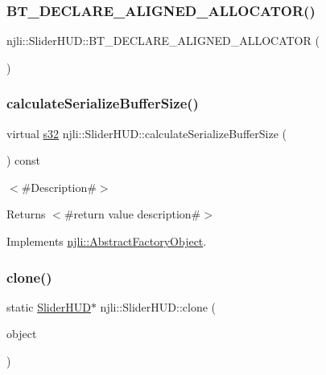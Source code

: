 \subsubsection{\texorpdfstring{B\+T\+\_\+\+D\+E\+C\+L\+A\+R\+E\+\_\+\+A\+L\+I\+G\+N\+E\+D\+\_\+\+A\+L\+L\+O\+C\+A\+T\+O\+R()}{BT\_DECLARE\_ALIGNED\_ALLOCATOR()}}
{\footnotesize\ttfamily njli\+::\+Slider\+H\+U\+D\+::\+B\+T\+\_\+\+D\+E\+C\+L\+A\+R\+E\+\_\+\+A\+L\+I\+G\+N\+E\+D\+\_\+\+A\+L\+L\+O\+C\+A\+T\+OR (\begin{DoxyParamCaption}{ }\end{DoxyParamCaption})\hspace{0.3cm}{\ttfamily [protected]}}

\mbox{\label{classnjli_1_1_slider_h_u_d_ac8b3369b0456c8fa0d8765975edc3ed0}} 
\subsubsection{\texorpdfstring{calculate\+Serialize\+Buffer\+Size()}{calculateSerializeBufferSize()}}
{\footnotesize\ttfamily virtual \mbox{\hyperlink{_util_8h_aa62c75d314a0d1f37f79c4b73b2292e2}{s32}} njli\+::\+Slider\+H\+U\+D\+::calculate\+Serialize\+Buffer\+Size (\begin{DoxyParamCaption}{ }\end{DoxyParamCaption}) const\hspace{0.3cm}{\ttfamily [virtual]}}

$<$\#\+Description\#$>$

\begin{DoxyReturn}{Returns}
$<$\#return value description\#$>$ 
\end{DoxyReturn}


Implements \mbox{\hyperlink{classnjli_1_1_abstract_factory_object_a4763d05bc9dc37c559111f8bb30e1dd8}{njli\+::\+Abstract\+Factory\+Object}}.

\mbox{\label{classnjli_1_1_slider_h_u_d_a6a515652bfa2ef7926ea86b80e3f40f7}} 
\subsubsection{\texorpdfstring{clone()}{clone()}}
{\footnotesize\ttfamily static \mbox{\hyperlink{classnjli_1_1_slider_h_u_d}{Slider\+H\+UD}}$\ast$ njli\+::\+Slider\+H\+U\+D\+::clone (\begin{DoxyParamCaption}\item[{const \mbox{\hyperlink{classnjli_1_1_slider_h_u_d}{Slider\+H\+UD}} \&}]{object }\end{DoxyParamCaption})\hspace{0.3cm}{\ttfamily [static]}}

